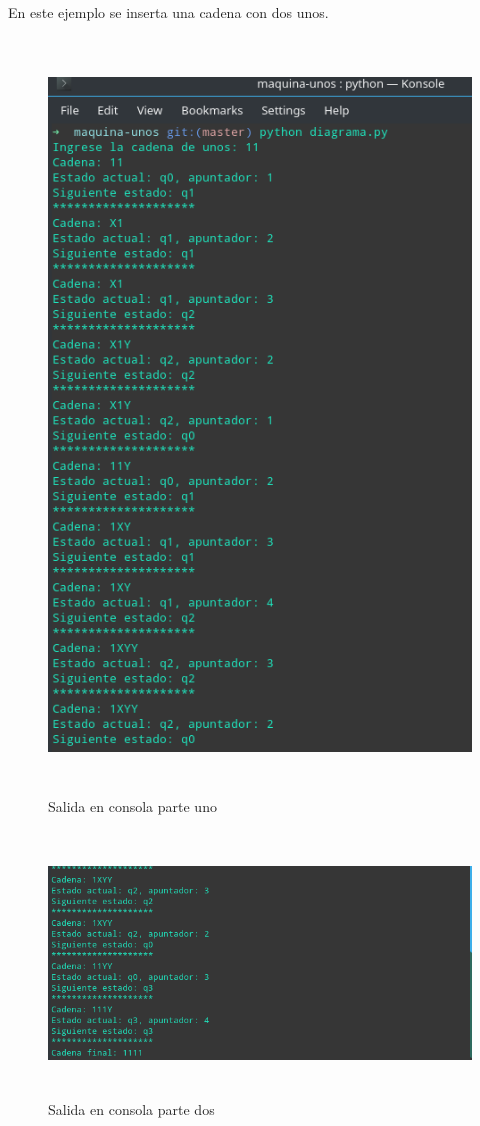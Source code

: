 En este ejemplo se inserta una cadena con dos unos.
\begin{figure}[H]
\begin{center}
 \includegraphics[width=13cm, height=20cm]{./img/dos_consola.png}
 \caption{Salida en consola parte uno}
 \label{fig:dos_consola}
\end{center}
\end{figure}

\begin{figure}[H]
\begin{center}
 \includegraphics[width=13cm, height=7cm]{./img/dos_console.png}
 \caption{Salida en consola parte dos}
 \label{fig:dos_console}
\end{center}
\end{figure}


